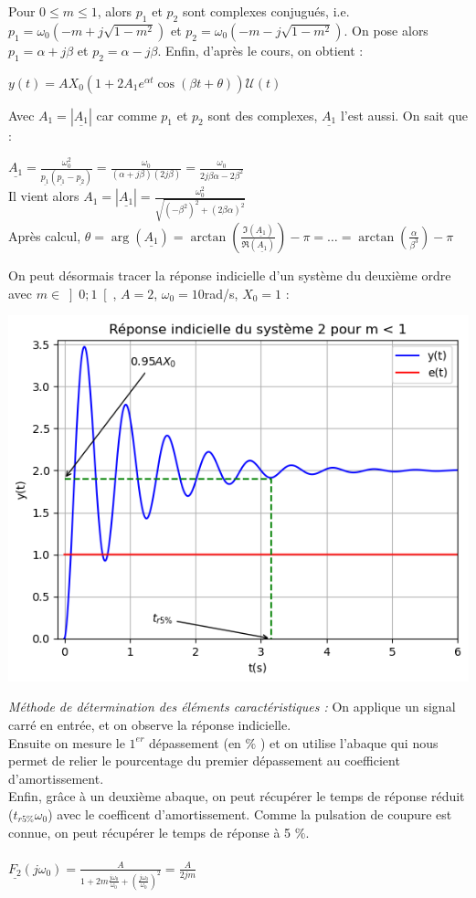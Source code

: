 \documentclass[12pt]{article}
\begin{document}
Pour $0\le m \le 1$, alors $p_1$ et $p_2$ sont complexes conjugués, i.e. $p_1 = \omega_0(-m+j\sqrt{1-m^2})$ et $p_2 = \omega_0(-m-j\sqrt{1-m^2})$.
On pose alors $p_1 = \alpha+j\beta$ et $p_2 = \alpha-j\beta$. Enfin, d'après le cours, on obtient : 
\begin{center}
    $y(t) = AX_0(1+2A_1e^{\alpha t}\cos(\beta t + \theta))\mathcal{U}(t)$
\end{center}
Avec $A_1 = |\underline{A_1}|$ car comme $p_1$ et $p_2$ sont des complexes, $\underline{A_1}$ l'est aussi.
On sait que : 
\begin{center}
 $\underline{A_1} = \frac{\omega_0^2}{\underline{p_1}(\underline{p_1} - \underline{p_2})} = \frac{\omega_0}{(\alpha + j\beta)(2j\beta)} = \frac{\omega_0}{2j\beta\alpha -2\beta^2}$
\\Il vient alors $A_1 = |\underline{A_1}| = \frac{\omega_0^2}{\sqrt{(-\beta^2)^2 + (2\beta\alpha)^2}}$
\\Après calcul, $\theta = \arg(\underline{A_1}) = \arctan(\frac{\Im(\underline{A_1})}{\Re(\underline{A_1})}) - \pi = \dots = \arctan(\frac{\alpha}{\beta^3}) - \pi$
\end{center}
On peut désormais tracer la réponse indicielle d'un système du deuxième ordre avec $m \in \left]0;1\right[$, $A = 2$, $\omega_0 = 10$rad/s, $X_0 = 1$  :
\begin{center}
    \includegraphics{TP1/Syst_2/Reponse_indicielle_m_inf_1.png}
\end{center}
\textit{Méthode de détermination des éléments caractéristiques :} On applique un signal carré en entrée, et on observe la réponse indicielle. 
\\Ensuite on mesure le $1^{er}$ dépassement (en $\%$ ) et on utilise l'abaque qui nous permet de relier le pourcentage du premier dépassement au coefficient d'amortissement.
\\Enfin, grâce à un deuxième abaque, on peut récupérer le temps de réponse réduit ($t_{r5\%}\omega_0$) avec le coefficent d'amortissement. Comme la pulsation de coupure est connue, on peut récupérer le temps de réponse à 5 $\%$.
\\\\$\underline{F_2}(j\omega_0) = \frac{A}{1 + 2m\frac{j\omega_0}{\omega_0} + (\frac{j\omega_0}{\omega_0})^2} = \frac{A}{2jm}$
\end{document}
